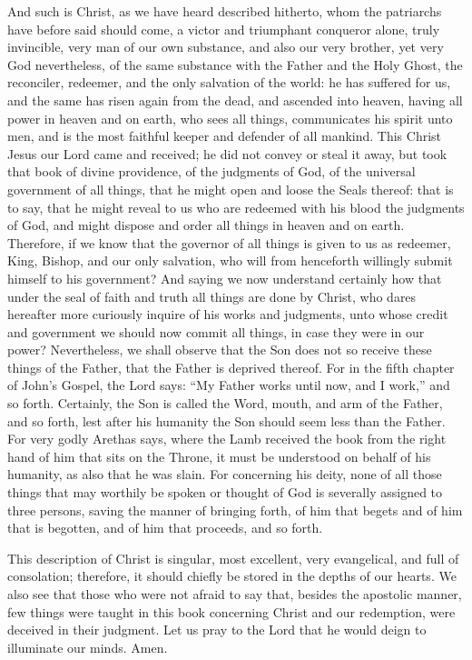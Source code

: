 And such is Christ, as we have heard described hitherto, whom the patriarchs have before said should come, a victor and triumphant conqueror alone, truly invincible, very man of our own substance, and also our very brother, yet very God nevertheless, of the same substance with the Father and the Holy Ghost, the reconciler, redeemer, and the only salvation of the world: he has suffered for us, and the same has risen again from the dead, and ascended into heaven, having all power in heaven and on earth, who sees all things, communicates his spirit unto men, and is the most faithful keeper and defender of all mankind. This Christ Jesus our Lord came and received; he did not convey or steal it away, but took that book of divine providence, of the judgments of God, of the universal government of all things, that he might open and loose the Seals thereof: that is to say, that he might reveal to us who are redeemed with his blood the judgments of God, and might dispose and order all things in heaven and on earth. Therefore, if we know that the governor of all things is given to us as redeemer, King, Bishop, and our only salvation, who will from henceforth willingly submit himself to his government? And saying we now understand certainly how that under the seal of faith and truth all things are done by Christ, who dares hereafter more curiously inquire of his works and judgments, unto whose credit and government we should now commit all things, in case they were in our power? Nevertheless, we shall observe that the Son does not so receive these things of the Father, that the Father is deprived thereof. For in the fifth chapter of John’s Gospel, the Lord says: “My Father works until now, and I work,” and so forth. Certainly, the Son is called the Word, mouth, and arm of the Father, and so forth, lest after his humanity the Son should seem less than the Father. For very godly Arethas says, where the Lamb received the book from the right hand of him that sits on the Throne, it must be understood on behalf of his humanity, as also that he was slain. For concerning his deity, none of all those things that may worthily be spoken or thought of God is severally assigned to three persons, saving the manner of bringing forth, of him that begets and of him that is begotten, and of him that proceeds, and so forth.

This description of Christ is singular, most excellent, very evangelical, and full of consolation; therefore, it should chiefly be stored in the depths of our hearts. We also see that those who were not afraid to say that, besides the apostolic manner, few things were taught in this book concerning Christ and our redemption, were deceived in their judgment. Let us pray to the Lord that he would deign to illuminate our minds. Amen.
